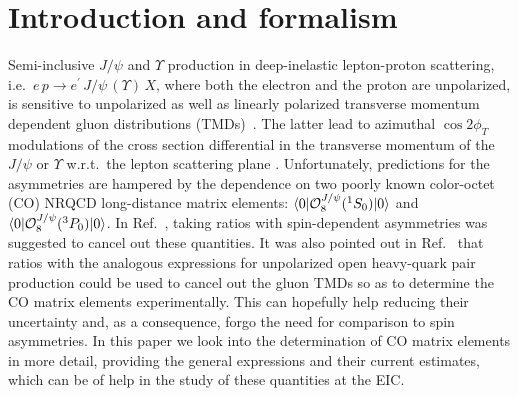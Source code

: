 \documentclass[prd,aps,preprintnumbers,nofootinbib,superscriptaddress]{revtex4}
\begin{document}
\section{Introduction and formalism}
Semi-inclusive $J/\psi$ and $\Upsilon$ production in deep-inelastic lepton-proton scattering, i.e.\ $e\,p \to e^\prime \,J/\psi \,(\Upsilon)\,X$, where both the electron and the proton are unpolarized, is sensitive to unpolarized as well as linearly polarized transverse momentum dependent gluon distributions (TMDs)~\cite{Mulders:2000sh,Meissner:2007rx,Boer:2016xqr}. The latter lead to azimuthal $\cos 2\phi_{\scriptscriptstyle{T}}$ modulations of the cross section differential in the transverse momentum of the $J/\psi$ or $\Upsilon$ w.r.t.\ the lepton scattering plane \cite{Mukherjee:2016qxa,Rajesh:2018qks,Bacchetta:2018ivt}.
Unfortunately, predictions for the asymmetries are hampered by the dependence on two poorly known color-octet (CO) NRQCD long-distance matrix elements: $\langle0\vert{\cal O}_{8}^{J/\psi}(^{1}S_{0})\vert0\rangle$ and $\langle0\vert{\cal O}_{8}^{J/\psi}(^{3}P_{0})\vert0\rangle$. 
In Ref.~\cite{Bacchetta:2018ivt}, taking ratios with spin-dependent asymmetries was suggested to cancel out these quantities. 
It was also pointed out in Ref.~\cite{Bacchetta:2018ivt} that ratios with the analogous expressions for unpolarized open heavy-quark pair production could be used to cancel out the gluon TMDs so as to determine the CO matrix elements experimentally. This can hopefully help reducing their uncertainty and, as a consequence, forgo the need for comparison to spin asymmetries. In this paper we look into the determination of CO matrix elements in more detail, providing the general expressions and their current estimates, which can be of help in the study of these quantities at the EIC.  
\end{document}
